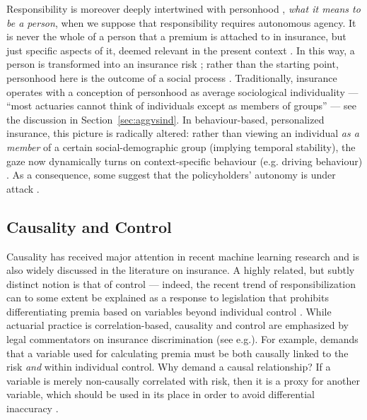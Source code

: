 \documentclass[11pt]{article} %
\makeatletter
\newcommand*{\eg}{e.g.\@\xspace}
\makeatother
\begin{document}
Responsibility is moreover deeply intertwined with personhood \citep{mcfall2018or,moor2018price}, \textit{what it means to be a person}, when we suppose that responsibility requires autonomous agency. It is never the whole of a person that a premium is attached to in insurance, but just specific aspects of it, deemed relevant in the present context \citep{mcfall2018or}. In this way, a person is transformed into an insurance risk \citep{van2014politics}; rather than the starting point, personhood here is the outcome of a social process \citep{mcfall2018or}. Traditionally, insurance operates with a conception of personhood as average sociological individuality \citep{dean1998risk,krippner2022person} --- ``most actuaries
cannot think of individuals except as members of groups'' \citep{brilmayer1979sex} --- see the discussion in Section~\ref{sec:aggvsind}. In behaviour-based, personalized insurance, this picture is radically altered: rather than viewing an individual \textit{as a member} of a certain social-demographic group (implying temporal stability), the gaze now dynamically turns on context-specific behaviour (\eg driving behaviour)  \citep{moor2018price,mcfall2018or,lury2019algorithmic}.  As a consequence, some suggest that the policyholders' autonomy is under attack \citep{tanninen2020contested}. 







\subsection{Causality and Control}
\label{sec:causalitycontrol}
Causality has received major attention in recent machine learning research and is also widely discussed in the literature on insurance. A highly related, but subtly distinct notion is that of control --- indeed, the recent trend of responsibilization can to some extent be explained as a response to legislation that prohibits differentiating premia based on variables beyond individual control \citep{meyers2018enacting}.
While actuarial practice is correlation-based, causality and control are emphasized by legal commentators on insurance discrimination (see \eg \citep{abraham1985efficiency,gaulding1994race,avraham2013understanding,avraham2017discrimination}). For example, \citet{avraham2017discrimination} demands that a variable used for calculating premia must be both causally linked to the risk \textit{and} within individual control. Why demand a causal relationship? If a variable is merely non-causally correlated with risk, then it is a proxy for another variable, which should be used in its place in order to avoid differential inaccuracy \citep{avraham2013understanding}.
\end{document}
